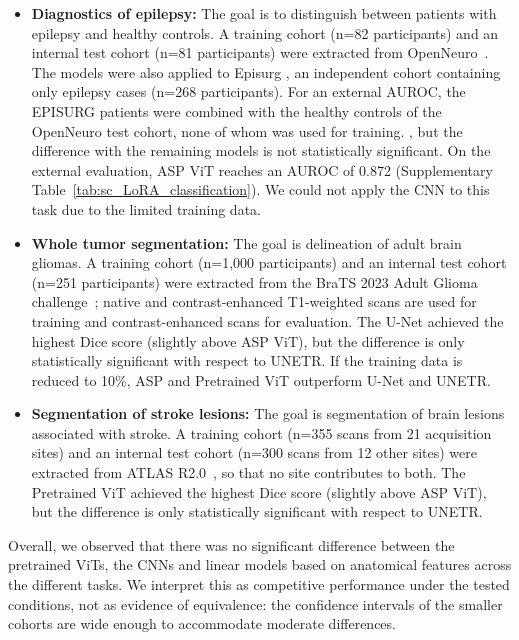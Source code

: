 \documentclass[pdflatex,sn-nature]{sn-jnl}%
\newif\ifhighlight
\newcommand{\rev}[1]{\ifhighlight{\color{blue}{}#1}\else#1\fi}%
\newcommand{\revdel}[1]{\ifhighlight{\color{red}\sout{#1}}\fi}
\theoremstyle{thmstyleone}%
\theoremstyle{thmstyletwo}%
\theoremstyle{thmstylethree}%
\begin{document}
\begin{itemize}
\item \textbf{Diagnostics of epilepsy:} The goal is to distinguish between patients with epilepsy and healthy controls. A training cohort (n=82\rev{ participants}) and an internal test cohort (n=81\rev{ participants}) were extracted from OpenNeuro~\citep{schuch2023open}. The models were also applied to Episurg  \citep{perez2021self}, an independent cohort containing only epilepsy cases (n=268\rev{ participants}). \rev{For an external AUROC, the EPISURG patients were combined with the healthy controls of the OpenNeuro test cohort, none of whom was used for training.} 
\revdel{The Pretrained ViT achieves the highest AUC}, but the difference with the remaining models is not statistically significant. \rev{On the external evaluation, ASP ViT reaches an AUROC of 0.872 (Supplementary Table~\ref{tab:sc_LoRA_classification}).} We could not apply the CNN to this task due to the limited training data.
\item \textbf{Whole tumor segmentation:} The goal is delineation of adult brain gliomas. A training cohort (n=1,000\rev{ participants}) and an internal test cohort (n=251\rev{ participants}) were extracted from the BraTS 2023 Adult Glioma challenge~\citep{baid2021rsna, menze2014multimodal, bakas2017advancing}\rev{; native and contrast-enhanced T1-weighted scans are used for training and contrast-enhanced scans for evaluation}. The U-Net achieved the highest Dice score (slightly above ASP ViT), but the difference is only statistically significant with respect to UNETR. If the training data is reduced to 10\%, ASP and Pretrained ViT outperform U-Net and UNETR.
 \item \textbf{Segmentation of stroke lesions:} The goal is segmentation of brain lesions associated with stroke. A training cohort (n=355\rev{ scans from 21 acquisition sites}) and an internal test cohort (n=300\rev{ scans from 12 other sites}) were extracted from ATLAS R2.0~\citep{liew2022large}\rev{, so that no site contributes to both}. The Pretrained ViT achieved the highest Dice score (slightly above ASP ViT), but the difference is only statistically significant with respect to UNETR.
\end{itemize}

Overall, we observed that there was no significant difference between the pretrained ViTs, the CNNs and linear models based on anatomical features across the different tasks. \rev{We interpret this as competitive performance under the tested conditions, not as evidence of equivalence: the confidence intervals of the smaller cohorts are wide enough to accommodate moderate differences.} 
\end{document}
